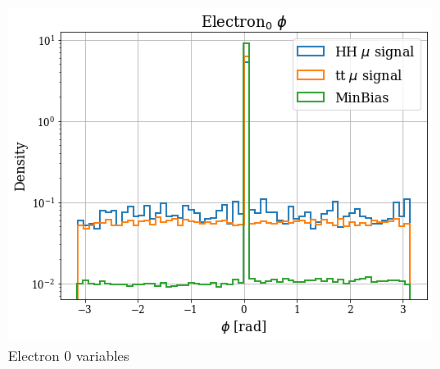 \documentclass[../main.tex]{subfiles}
\begin{document}
\begin{figure}[!ht]
\begin{minipage}[b]{0.33\linewidth}
\end{minipage} %
  \begin{minipage}[b]{0.33\linewidth}
    \centering
    \includegraphics[width=1\linewidth]{Chapters/Plots/Hist_1mu_electron0_Phi.png}
  \end{minipage}
  \caption{Electron 0 variables}
\end{figure}
\end{document}
